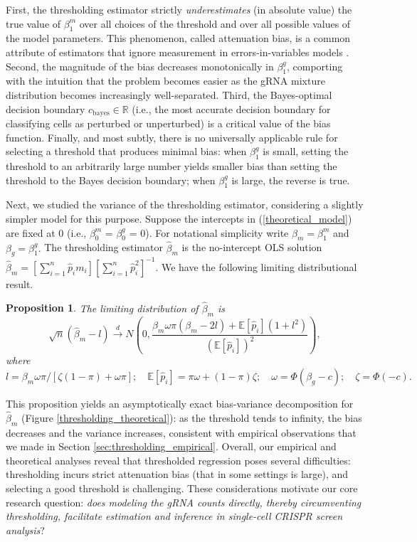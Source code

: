 \documentclass[12pt]{article}
\newtheorem{proposition}{Proposition}
\begin{document}
First, the thresholding estimator strictly \textit{underestimates} (in absolute value) the true value of $\beta^m_1$ over all choices of the threshold and over all possible values of the model parameters. This phenomenon, called attenuation bias, is a common attribute of estimators that ignore measurement in errors-in-variables models \cite{Stefanski2000a}. Second, the magnitude of the bias decreases monotonically in $\beta^g_1$, comporting with the intuition that the problem becomes easier as the gRNA mixture distribution becomes increasingly well-separated. Third, the Bayes-optimal decision boundary $c_\textrm{bayes} \in \mathbb{R}$ (i.e., the most accurate decision boundary for classifying cells as perturbed or unperturbed) is a critical value of the bias function. Finally, and most subtly, there is no universally applicable rule for selecting a threshold that produces minimal bias: when $\beta^g_1$ is small, setting the threshold to an arbitrarily large number yields smaller bias than setting the threshold to the Bayes decision boundary; when $\beta^g_1$ is large, the reverse is true.

Next, we studied the variance of the thresholding estimator, considering a slightly simpler model for this purpose. Suppose the intercepts in (\ref{theoretical_model}) are fixed at $0$ (i.e., $\beta^m_0$ = $\beta^g_0$ = 0). For notational simplicity write $\beta_m = \beta^m_1$ and $\beta_g = \beta^g_1.$ The thresholding estimator $\hat{\beta}_m$ is the no-intercept OLS solution $\hat{\beta}_m = \left[\sum_{i=1}^n \hat{p}_i m_i \right]\left[\sum_{i=1}^n \hat{p}_i^2 \right]^{-1}.$ We have the following limiting distributional result.
\begin{proposition}\label{prop:bv_decomp}
	The limiting distribution of $\hat{\beta}_m$ is
	$$\sqrt{n}(\hat{\beta}_m - l) \xrightarrow{d} N\left(0, \frac{ \beta_m \omega\pi(\beta_m - 2l) + \mathbb{E}[\hat{p}_i](1 + l^2) }{\left(\mathbb{E}[\hat{p}_i]\right)^2} \right),$$ where $$l = \beta_m \omega \pi/[\zeta(1-\pi) + \omega \pi]; \quad
	\mathbb{E}[\hat{p}_i] = \pi \omega + (1-\pi) \zeta; \quad
	\omega = \Phi(\beta_g - c); \quad
	\zeta = \Phi(-c).$$
\end{proposition}
This proposition yields an asymptotically exact bias-variance decomposition for $\hat{\beta}_m$ (Figure \ref{thresholding_theoretical}): as the threshold tends to infinity, the bias decreases and the variance increases, consistent with empirical observations that we made in Section \ref{sec:thresholding_empirical}. Overall, our empirical and theoretical analyses reveal that thresholded regression poses several difficulties: thresholding incurs strict attenuation bias (that in some settings is large), and selecting a good threshold is challenging. These considerations motivate our core research question: \textit{does modeling the gRNA counts directly, thereby circumventing thresholding, facilitate estimation and inference in single-cell CRISPR screen analysis}?
\end{document}
